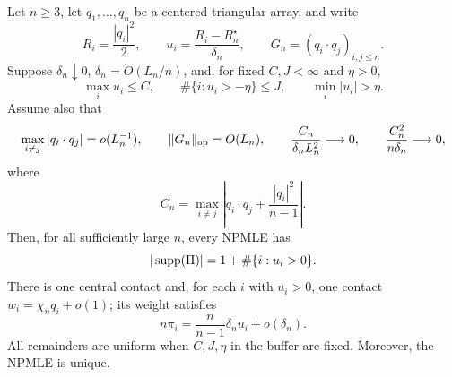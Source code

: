 \begin{proposition}
\label{prop:buffered-simplex-support}
Let \(n\ge3\), let \(q_1,\ldots,q_n\) be a centered triangular array, and
write
\[
 R_i=\frac{|q_i|^2}{2},
 \qquad
 u_i=\frac{R_i-R_n^\star}{\delta_n},
 \qquad
 G_n=(q_i\cdot q_j)_{i,j\le n}.
\]
Suppose \(\delta_n\downarrow0\), \(\delta_n=O(L_n/n)\), and, for fixed
\(C,J<\infty\) and \(\eta>0\),
\[
 \max_i u_i\le C,
 \qquad
 \#\{i:u_i>-\eta\}\le J,
 \qquad
 \min_i|u_i|>\eta.
\]
Assume also that
\begin{equation}
\label{eq:buffered-simplex-assumptions}
 \max_{i\ne j}|q_i\cdot q_j|=o(L_n^{-1}),
 \qquad
 \|G_n\|_{\rm op}=O(L_n),
 \qquad
 \frac{C_n}{\delta_nL_n^2}\longrightarrow0,
 \qquad
 \frac{C_n^2}{n\delta_n}\longrightarrow0,
\end{equation}
where
\[
 C_n=\max_{i\ne j}
 \left|q_i\cdot q_j+\frac{|q_i|^2}{n-1}\right|.
\]
Then, for all sufficiently large \(n\), every NPMLE has
\begin{equation}
\label{eq:buffered-simplex-count}
 |\operatorname{supp}(\Pi)|=1+\#\{i:u_i>0\}.
\end{equation}
There is one central contact and, for each \(i\) with \(u_i>0\), one
contact \(w_i=\chi_nq_i+o(1)\); its weight satisfies
\begin{equation}
\label{eq:buffered-simplex-mass}
 n\pi_i=\frac{n}{n-1}\delta_nu_i+o(\delta_n).
\end{equation}
All remainders are uniform when \(C,J,\eta\) in the buffer are fixed.
Moreover, the NPMLE is unique.
\end{proposition}

